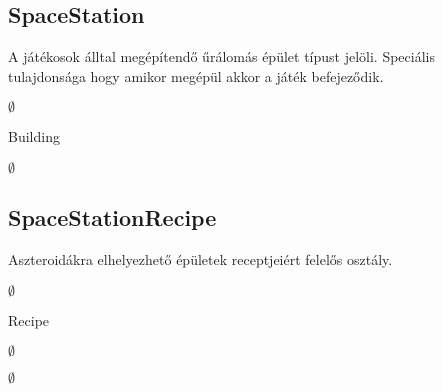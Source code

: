 \subsection{SpaceStation}
\begin{class-template-responsibility}
A játékosok álltal megépítendő űrálomás épület típust jelöli. Speciális tulajdonsága hogy amikor megépül akkor a játék befejeződik.
\end{class-template-responsibility}
\begin{class-template-interface}
$\emptyset$
\end{class-template-interface}
\begin{class-template-baseclass}
Building
\end{class-template-baseclass}
\begin{class-template-attribute}
\item[] $\emptyset$
\end{class-template-attribute}
\begin{class-template-method}
\end{class-template-method}


\subsection{SpaceStationRecipe}
\begin{class-template-responsibility}
Aszteroidákra elhelyezhető épületek receptjeiért felelős osztály. 
\end{class-template-responsibility}
\begin{class-template-interface}
$\emptyset$
\end{class-template-interface}
\begin{class-template-baseclass}
Recipe
\end{class-template-baseclass}
\begin{class-template-attribute}
\item[] $\emptyset$
\end{class-template-attribute}
\begin{class-template-method}
\item[] $\emptyset$
\end{class-template-method}


